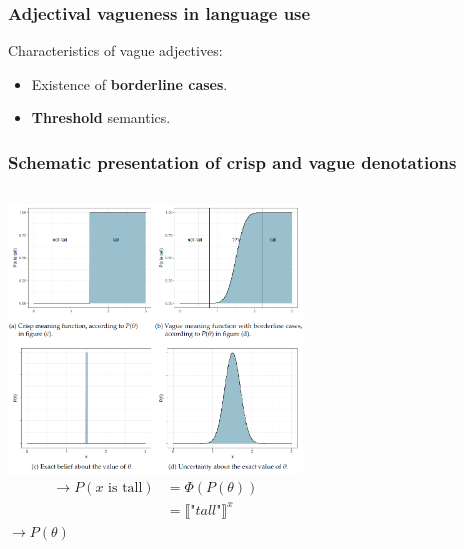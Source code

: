 \documentclass[8pt]{beamer}
\newcommand{\stp}{\item[$\bullet$]}%
\begin{document}
\begin{frame}
\frametitle{Adjectival vagueness in language use}
\vskip5mm
Characteristics of vague adjectives:\\
\vskip5mm
	\begin{itemize}
		\stp Existence of \textbf{borderline cases}.\newline
		\stp \textbf{Threshold} semantics.\newline
    \end{itemize}
\end{frame}

\begin{frame}
\frametitle{Schematic presentation of crisp and vague denotations}

	\begin{columns}
		\column{7.8cm}
		\vskip5mm
		\includegraphics[width=7.8cm]{bilder/schema-crisp-vague.png}\\
		\vskip5mm
    	\column{4cm}
      	\begin{align*}
      	\rightarrow P(x \text{ is tall}) &= \Phi(P(\theta)) \\
		&= \llbracket \textit{"tall"} \rrbracket^x
      	\end{align*}
		\vskip3cm
		$\rightarrow P(\theta)$
	\end{columns}
\end{frame}

\end{document}
